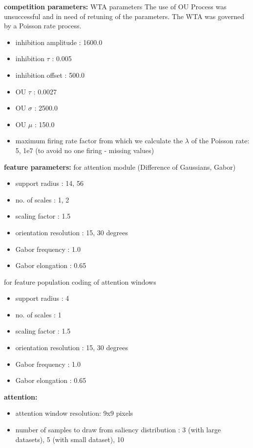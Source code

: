 \documentclass{report}
\begin{document}
\textbf{competition parameters:}
WTA parameters
The use of OU Process was unsuccessful and in need of retuning of the parameters. The WTA was governed by a Poisson rate process.
\begin{itemize}
	\item inhibition amplitude : 1600.0
	\item inhibition $\tau$ : 0.005
	\item inhibition offset : 500.0
	\item OU $\tau$ : 0.0027
	\item OU $\sigma$ : 2500.0
	\item OU $\mu$ : 150.0
	\item maximum firing rate factor from which we calculate the $\lambda$ of the Poisson rate: 5, 1e7 (to avoid no one firing - missing values)
\end{itemize}
    
\textbf{feature parameters:}
for attention module (Difference of Gaussians, Gabor)
\begin{itemize}
	\item support radius : 14, 56
	\item no. of scales : 1, 2
	\item scaling factor : 1.5
	\item orientation resolution : 15, 30 degrees
	\item Gabor frequency : 1.0
	\item Gabor elongation : 0.65
\end{itemize}

for feature population coding of attention windows
\begin{itemize}
	\item support radius : 4
	\item no. of scales : 1
	\item scaling factor : 1.5
	\item orientation resolution : 15, 30 degrees
	\item Gabor frequency : 1.0
	\item Gabor elongation : 0.65
\end{itemize}
		
\textbf{attention:}
\begin{itemize}
	\item attention window resolution: 9x9 pixels
	\item number of samples to draw from saliency distribution : 3 (with large datasets), 5 (with small dataset), 10
\end{itemize}
\end{document}
